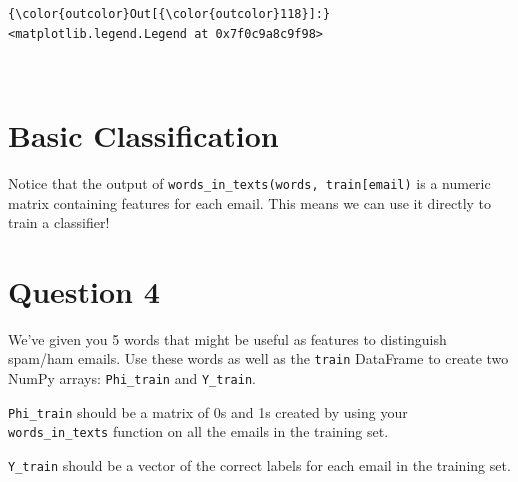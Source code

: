 \documentclass[11pt]{article}
\begin{document}
\begin{Verbatim}[commandchars=\\\{\}]
{\color{outcolor}Out[{\color{outcolor}118}]:} <matplotlib.legend.Legend at 0x7f0c9a8c9f98>
\end{Verbatim}
            
    \begin{center}
    \end{center}
    { \hspace*{\fill} \\}
    
    \section{Basic Classification}\label{basic-classification}

Notice that the output of
\texttt{words\_in\_texts(words,\ train{[}\textquotesingle{}email\textquotesingle{}{]})}
is a numeric matrix containing features for each email. This means we
can use it directly to train a classifier!

    \section{Question 4}\label{question-4}

We've given you 5 words that might be useful as features to distinguish
spam/ham emails. Use these words as well as the \texttt{train} DataFrame
to create two NumPy arrays: \texttt{Phi\_train} and \texttt{Y\_train}.

\texttt{Phi\_train} should be a matrix of 0s and 1s created by using
your \texttt{words\_in\_texts} function on all the emails in the
training set.

\texttt{Y\_train} should be a vector of the correct labels for each
email in the training set.
\end{document}
